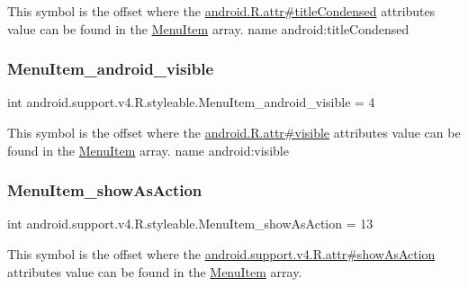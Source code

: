 This symbol is the offset where the \hyperlink{}{android.\+R.\+attr\#title\+Condensed} attribute\textquotesingle{}s value can be found in the \hyperlink{classandroid_1_1support_1_1v4_1_1R_1_1styleable_a4234e016636b99c0c3d9cfc512903697}{Menu\+Item} array.  name android\+:title\+Condensed \mbox{\label{classandroid_1_1support_1_1v4_1_1R_1_1styleable_a7ecbdc18eb559caa4b13337a04e90d37}} 
\subsubsection{\texorpdfstring{Menu\+Item\+\_\+android\+\_\+visible}{MenuItem\_android\_visible}}
{\footnotesize\ttfamily int android.\+support.\+v4.\+R.\+styleable.\+Menu\+Item\+\_\+android\+\_\+visible = 4\hspace{0.3cm}{\ttfamily [static]}}

This symbol is the offset where the \hyperlink{}{android.\+R.\+attr\#visible} attribute\textquotesingle{}s value can be found in the \hyperlink{classandroid_1_1support_1_1v4_1_1R_1_1styleable_a4234e016636b99c0c3d9cfc512903697}{Menu\+Item} array.  name android\+:visible \mbox{\label{classandroid_1_1support_1_1v4_1_1R_1_1styleable_af0324d2b0e053a7dd60cd8d48f7915dc}} 
\subsubsection{\texorpdfstring{Menu\+Item\+\_\+show\+As\+Action}{MenuItem\_showAsAction}}
{\footnotesize\ttfamily int android.\+support.\+v4.\+R.\+styleable.\+Menu\+Item\+\_\+show\+As\+Action = 13\hspace{0.3cm}{\ttfamily [static]}}

This symbol is the offset where the \hyperlink{classandroid_1_1support_1_1v4_1_1R_1_1attr_abcd33c251bf516613a4d29627aef5c27}{android.\+support.\+v4.\+R.\+attr\#show\+As\+Action} attribute\textquotesingle{}s value can be found in the \hyperlink{classandroid_1_1support_1_1v4_1_1R_1_1styleable_a4234e016636b99c0c3d9cfc512903697}{Menu\+Item} array.

